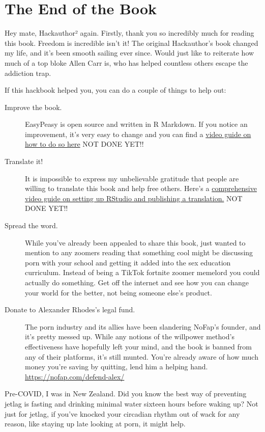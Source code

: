\documentclass[
]{book}
\begin{document}
\hypertarget{the-end-of-the-book}{%
\chapter{The End of the Book}\label{the-end-of-the-book}}

Hey mate, Hackauthor² again. Firstly, thank you so incredibly much for reading this book. Freedom is incredible isn't it! The original Hackauthor's book changed my life, and it's been smooth sailing ever since. Would just like to reiterate how much of a top bloke Allen Carr is, who has helped countless others escape the addiction trap.

If this hackbook helped you, you can do a couple of things to help out:

\begin{description}
\item[Improve the book.]
EasyPeasy is open source and written in R Markdown. If you notice an improvement, it's very easy to change and you can find a \href{}{video guide on how to do so here} NOT DONE YET!!
\item[Translate it!]
It is impossible to express my unbelievable gratitude that people are willing to translate this book and help free others. Here's a \href{}{comprehensive video guide on setting up RStudio and publishing a translation.} NOT DONE YET!!
\item[Spread the word.]
While you've already been appealed to share this book, just wanted to mention to any zoomers reading that something cool might be discussing porn with your school and getting it added into the sex education curriculum. Instead of being a TikTok fortnite zoomer memelord you could actually do something. Get off the internet and see how you can change your world for the better, not being someone else's product.
\item[Donate to Alexander Rhodes's legal fund.]
The porn industry and its allies have been slandering NoFap's founder, and it's pretty messed up. While any notions of the willpower method's effectiveness have hopefully left your mind, and the book is banned from any of their platforms, it's still munted. You're already aware of how much money you're saving by quitting, lend him a helping hand. \url{https://nofap.com/defend-alex/}
\end{description}

Pre-COVID, I was in New Zealand. Did you know the best way of preventing jetlag is fasting and drinking minimal water sixteen hours before waking up? Not just for jetlag, if you've knocked your circadian rhythm out of wack for any reason, like staying up late looking at porn, it might help.
\end{document}
